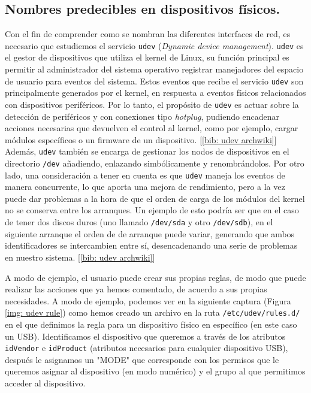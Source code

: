 \documentclass[12pt]{article}
\begin{document}
	\subsection{Nombres predecibles en dispositivos físicos.}
	\noindent Con el fin de comprender como se nombran las diferentes interfaces de red, es necesario que estudiemos el servicio \texttt{udev} (\textit{Dynamic device management}). \texttt{udev} es el gestor de dispositivos que utiliza el kernel de Linux, su función principal es permitir al administrador del sistema operativo registrar manejadores del espacio de usuario para eventos del sistema. Estos eventos que recibe el servicio \texttt{udev} son principalmente generados por el kernel, en respuesta a eventos físicos relacionados con dispositivos periféricos. Por lo tanto, el propósito de \texttt{udev} es actuar sobre la detección de periféricos y con conexiones tipo \textit{hotplug}, pudiendo encadenar acciones necesarias que devuelven el control al kernel, como por ejemplo, cargar módulos específicos o un firmware de un dispositivo. [\ref{bib: udev archwiki}] \\
	
	\noindent Además, \texttt{udev} también se encarga de gestionar los nodos de dispositivos en el directorio \texttt{/dev} añadiendo, enlazando simbólicamente y renombrándolos. Por otro lado, una consideración a tener en cuenta es que \texttt{udev} maneja los eventos de manera concurrente, lo que aporta una mejora de rendimiento, pero a la vez puede dar problemas a la hora de que el orden de carga de los módulos del kernel no se conserva entre los arranques. Un ejemplo de esto podría ser que en el caso de tener dos discos duros (uno llamado \texttt{/dev/sda} y otro \texttt{/dev/sdb}), en el siguiente arranque el orden de de arranque puede variar, generando que ambos identificadores se intercambien entre sí, desencadenando una serie de problemas en nuestro sistema. [\ref{bib: udev archwiki}]\\
	
	\pagebreak
	
	\noindent A modo de ejemplo, el usuario puede crear sus propias reglas, de modo que puede realizar las acciones que ya hemos comentado, de acuerdo a sus propias necesidades. A modo de ejemplo, podemos ver en la siguiente captura (Figura \ref{img: udev rule}) como hemos creado un archivo en la ruta \texttt{/etc/udev/rules.d/} en el que definimos la regla para un dispositivo físico en específico (en este caso un USB). Identificamos el dispositivo que queremos a través de los atributos \texttt{idVendor} e \texttt{idProduct} (atributos necesarios para cualquier dispositivo USB), después le asignamos un "MODE" que corresponde con los permisos que le queremos asignar al dispositivo (en modo numérico) y el grupo al que permitimos acceder al dispositivo.\\
	
\end{document}
